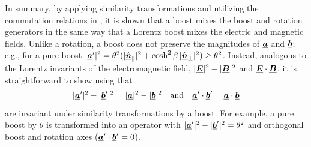 In summary, by applying similarity transformations and utilizing the commutation relations
in , it is shown that a boost mixes the boost and rotation generators
in the same way that a Lorentz boost mixes the electric and magnetic fields.
%
Unlike a rotation, a boost does not preserve the magnitudes of $\Pv{a}$ and $\Pv{b}$; e.g., for a pure boost
$|\Pv{a}'|^2 = \theta^2 (|\hat{\Pv{n}}_\parallel|^2 + \cosh^2\beta \, |\hat{\Pv{n}}_\perp|^2) \ge \theta^2$.
%
Instead, analogous to the Lorentz invariants of the electromagnetic field, $|\Pv{E}|^2-|\Pv{B}|^2$ and $\Pv{E}\cdot\Pv{B}$,
it is straightforward to show using  that
\begin{equation}
|\Pv{a}'|^2 - |\Pv{b}'|^2 = |\Pv{a}|^2 - |\Pv{b}|^2
\quad \textrm{and} \quad
\Pv{a}' \cdot \Pv{b}' = \Pv{a} \cdot \Pv{b}
\end{equation}
%
are invariant under similarity transformations by a boost.
%
For example, a pure boost by $\theta$ is transformed into an operator with $|\Pv{a}'|^2 - |\Pv{b}'|^2 = \theta^2$
and orthogonal boost and rotation axes ($\Pv{a}' \cdot \Pv{b}' = 0$).

%
%
%
%
%
%
%
%

